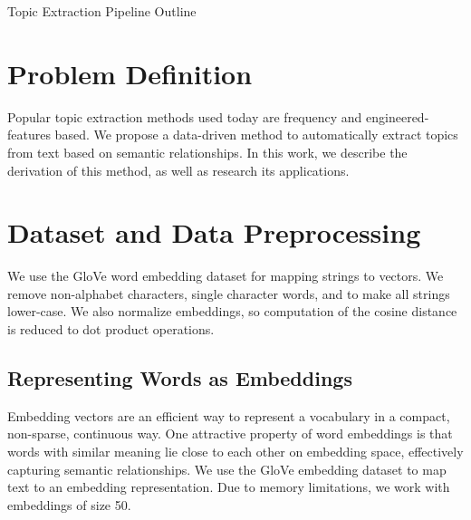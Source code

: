 \documentclass[12pt]{article}
\begin{document}
\begin{center}

Topic Extraction Pipeline Outline


\end{center}

\section{Problem Definition}
Popular topic extraction methods used today are frequency and engineered-features based. We propose a data-driven method to automatically extract topics from text based on semantic relationships. In this work, we describe the derivation of this method, as well as research its applications.

\section{Dataset and Data Preprocessing}

We use the GloVe word embedding dataset for mapping strings to vectors.
We remove non-alphabet characters, single character words, and to make all strings lower-case. We also normalize embeddings, so computation of the cosine distance is reduced to dot product operations.\\


\subsection{Representing Words as Embeddings}
 Embedding vectors are an efficient way to represent a vocabulary in a compact, non-sparse, continuous way. One attractive property of word embeddings is that words with similar meaning lie close to each other on embedding space, effectively capturing semantic relationships. We use the GloVe embedding dataset to map text to an embedding representation.
Due to memory limitations, we work with embeddings of size 50.
\end{document}
